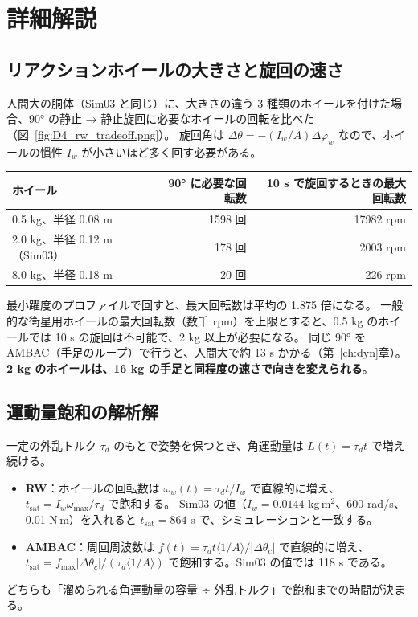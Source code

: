 \section{詳細解説}

\subsection{リアクションホイールの大きさと旋回の速さ}

人間大の胴体（Sim03 と同じ）に、大きさの違う 3 種類のホイールを付けた場合、90° の静止 → 静止旋回に必要なホイールの回転を比べた（図~\ref{fig:D4_rw_tradeoff.png}）。
旋回角は $\Delta\theta = -(I_w/A)\Delta\varphi_w$ なので、ホイールの慣性 $I_w$ が小さいほど多く回す必要がある。

\begin{longtable}{lrr}
\toprule
ホイール & 90° に必要な回転数 & 10 s で旋回するときの最大回転数 \\ \midrule \endhead
0.5 kg、半径 0.08 m & 1598 回 & 17982 rpm \\
2.0 kg、半径 0.12 m（Sim03） & 178 回 & 2003 rpm \\
8.0 kg、半径 0.18 m & 20 回 & 226 rpm \\
\bottomrule
\end{longtable}

最小躍度のプロファイルで回すと、最大回転数は平均の 1.875 倍になる。
一般的な衛星用ホイールの最大回転数（数千 rpm）を上限とすると、0.5 kg のホイールでは 10 s の旋回は不可能で、2 kg 以上が必要になる。
同じ 90° を AMBAC（手足のループ）で行うと、人間大で約 13 s かかる（第~\ref{ch:dyn}章）。\textbf{2 kg のホイールは、16 kg の手足と同程度の速さで向きを変えられる}。


\subsection{運動量飽和の解析解}

一定の外乱トルク $\tau_d$ のもとで姿勢を保つとき、角運動量は $L(t)=\tau_dt$ で増え続ける。
\begin{itemize}
\item \textbf{RW}：ホイールの回転数は $\omega_w(t) = \tau_dt/I_w$ で直線的に増え、$t_{\mathrm{sat}} = I_w\omega_{\max}/\tau_d$ で飽和する。
  Sim03 の値（$I_w=0.0144$ kg\,m$^2$、600 rad/s、0.01 N\,m）を入れると $t_{\mathrm{sat}} = 864$ s で、シミュレーションと一致する。
\item \textbf{AMBAC}：周回周波数は $f(t) = \tau_dt\langle1/A\rangle/|\Delta\theta_c|$ で直線的に増え、
  $t_{\mathrm{sat}} = f_{\max}|\Delta\theta_c|/(\tau_d\langle1/A\rangle)$ で飽和する。Sim03 の値では 118 s である。
\end{itemize}
どちらも「溜められる角運動量の容量 ÷ 外乱トルク」で飽和までの時間が決まる。

